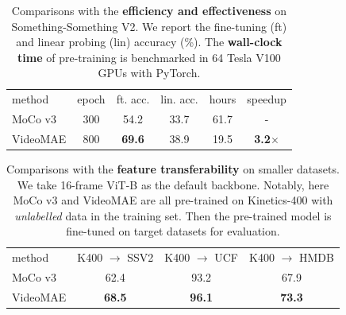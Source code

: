 \documentclass{article}
\newcommand{\tablestyle}[2]{\setlength{\tabcolsep}{#1}\renewcommand{\arraystretch}{#2}\centering\footnotesize}
\begin{document}
\begin{table}[t]
\vspace{-.2em}
\tablestyle{6pt}{1.05}
\begin{tabular}{lccccc}
method & epoch & ft. acc. & lin. acc. & hours & speedup \\
\shline
 MoCo v3 &  300 & 54.2 & 33.7 & 61.7 & - \\
 VideoMAE  &  800 & \textbf{69.6} & 38.9 & 19.5 & \textbf{3.2$\times$} \\
\end{tabular}
\vspace{.3em}
\caption{Comparisons with the \textbf{efficiency and effectiveness} on Something-Something V2. We report the fine-tuning (ft) and linear probing (lin) accuracy (\%). The \textbf{wall-clock time} of pre-training is benchmarked in 64 Tesla V100 GPUs with PyTorch.}
\label{tab:comparison_time} 
\vspace{-1.8em}
\end{table}
\begin{table}[t!]
\tablestyle{3pt}{1.05}
\begin{tabular}{lccc}
method &   K400 $\rightarrow$ SSV2 & K400 $\rightarrow$ UCF & K400 $\rightarrow$ HMDB  \\
\shline
 MoCo v3    & 62.4 & 93.2  & 67.9 \\
VideoMAE   & \textbf{68.5} & \textbf{96.1}  & \textbf{73.3} \\
\end{tabular}
\caption{Comparisons with the \textbf{feature transferability} on smaller datasets. We take 16-frame ViT-B as the default backbone. Notably, here MoCo v3 and VideoMAE are all pre-trained on Kinetics-400 with \textit{unlabelled} data in the training set. Then the pre-trained model is fine-tuned on target datasets for evaluation.}
\label{tab:transfer} 
\vspace{-2em}
\end{table}
\end{document}
